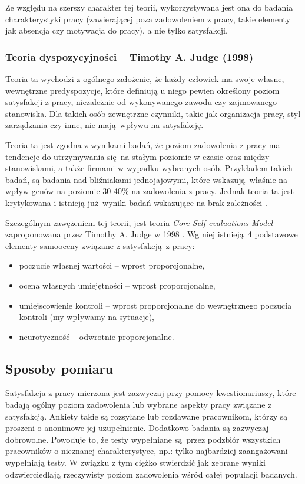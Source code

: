 Ze względu na szerszy charakter tej teorii, wykorzystywana jest ona do badania charakterystyki pracy (zawierającej poza zadowoleniem z pracy, takie elementy jak absencja czy motywacja do pracy), a nie tylko satysfakcji.

\subsubsection{Teoria dyspozycyjności -- Timothy A. Judge (1998)}
Teoria ta wychodzi z ogólnego założenie, że każdy człowiek ma swoje własne, wewnętrzne predyspozycje, które definiują u niego pewien określony poziom satysfakcji z pracy, niezależnie od wykonywanego zawodu czy zajmowanego stanowiska. Dla takich osób zewnętrzne czynniki, takie jak organizacja pracy, styl zarządzania czy inne, nie mają wpływu na satysfakcję.

Teoria ta jest zgodna z wynikami badań, że poziom zadowolenia z pracy ma tendencje do utrzymywania się na stałym poziomie w czasie oraz między stanowiskami, a także firmami w wypadku wybranych osób. Przykładem takich badań, są badania nad bliźniakami jednojajowymi, które wskazują właśnie na wpływ genów na poziomie 30-40\%  na zadowolenia z pracy. Jednak teoria ta jest krytykowana i istnieją już wyniki badań wskazujące na brak zależności \citep{schultz1985family}.

Szczególnym zawężeniem tej teorii, jest teoria \emph{Core Self-evaluations Model} zaproponowana przez Timothy A. Judge w 1998 \citep{judge1998dispositional,judge2001relationship}. Wg niej istnieją 4 podstawowe elementy samooceny związane z satysfakcją z pracy:
\begin{itemize}
\item poczucie własnej wartości -- wprost proporcjonalne,
\item ocena własnych umiejętności -- wprost proporcjonalne,
\item umiejscowienie kontroli -- wprost proporcjonalne do wewnętrznego poczucia kontroli (my wpływamy na sytuacje),
\item neurotyczność -- odwrotnie proporcjonalne.
\end{itemize}


\subsection{Sposoby pomiaru}
Satysfakcja z pracy mierzona jest zazwyczaj przy pomocy kwestionariuszy, które badają ogólny poziom zadowolenia lub wybrane aspekty pracy związane z satysfakcją. Ankiety takie są rozsyłane lub rozdawane pracownikom, którzy są proszeni o anonimowe jej uzupełnienie. Dodatkowo badania są zazwyczaj dobrowolne. Powoduje to, że testy wypełniane są przez podzbiór wszystkich pracowników o nieznanej charakterystyce, np.: tylko najbardziej zaangażowani wypełniają testy. W
związku z tym ciężko stwierdzić jak zebrane wyniki odzwierciedlają rzeczywisty poziom zadowolenia wśród całej populacji badanych.

